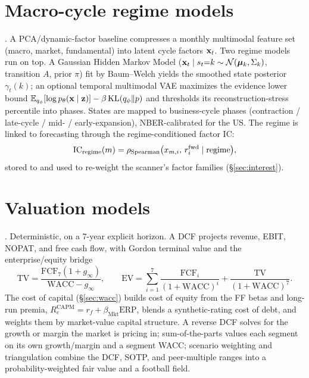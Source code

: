 \documentclass[11pt]{article}
\begin{document}
\section{Macro-cycle regime models}
\label{sec:regime}
. A PCA/dynamic-factor baseline compresses a monthly
multimodal feature set (macro, market, fundamental) into latent cycle factors
$\mathbf{x}_t$. Two regime models run on top. A Gaussian Hidden Markov Model
($\mathbf{x}_t\mid s_t{=}k\sim\mathcal N(\boldsymbol\mu_k,\Sigma_k)$, transition $A$, prior
$\pi$) fit by Baum--Welch yields the smoothed state posterior $\gamma_t(k)$; an
optional temporal multimodal VAE maximizes the evidence lower bound
$\mathbb{E}_{q_\phi}[\log p_\theta(\mathbf{x}\mid\mathbf{z})]-\beta\,\mathrm{KL}(q_\phi\Vert p)$ and
thresholds its reconstruction-stress percentile into phases. States are mapped to
business-cycle phases (contraction / late-cycle / mid- / early-expansion),
NBER-calibrated for the US. The regime is linked to forecasting through the
regime-conditioned factor IC:
\begin{equation}
  \mathrm{IC}_{\text{regime}}(m)=\rho_{\text{Spearman}}\big(x_{m,i},\,r^{\text{fwd}}_i \mid \text{regime}\big),
\end{equation}
stored to  and used to re-weight the scanner's
factor families (\S\ref{sec:interest}).

\section{Valuation models}
\label{sec:val}
. Deterministic, on a 7-year explicit horizon. A DCF projects
revenue, EBIT, NOPAT, and free cash flow, with Gordon terminal value and the
enterprise/equity bridge
\begin{equation}
  \text{TV}=\frac{\text{FCF}_7(1+g_\infty)}{\text{WACC}-g_\infty},\qquad
  \text{EV}=\sum_{i=1}^{7}\frac{\text{FCF}_i}{(1+\text{WACC})^i}+\frac{\text{TV}}{(1+\text{WACC})^7}.
\end{equation}
The cost of capital (\S\ref{sec:wacc}) builds cost of equity from the FF betas and
long-run premia, $R_e^{\text{CAPM}}=r_f+\beta_{\text{Mkt}}\text{ERP}$, blends a
synthetic-rating cost of debt, and weights them by market-value capital structure.
A reverse DCF solves for the growth or margin the market is pricing in;
sum-of-the-parts values each segment on its own growth/margin and a segment WACC;
scenario weighting and triangulation combine the DCF, SOTP, and peer-multiple ranges
into a probability-weighted fair value and a football field.
\end{document}
